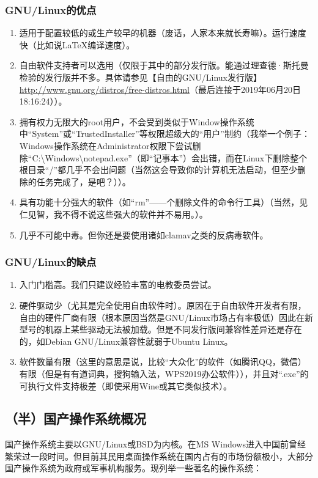 \subsubsection{GNU/Linux的优点}
\begin{enumerate}
	\item  适用于配置较低的或生产较早的机器（废话，人家本来就长寿嘛）。运行速度快（比如说\LaTeX 编译速度）。\par
	\item 自由软件支持者可以选用（仅限于其中的部分发行版。能通过理查德·斯托曼检验的发行版并不多。具体请参见【自由的GNU/Linux发行版】\url{http://www.gnu.org/distros/free-distros.html}（最后连接于2019年06月20日18:16:24））。\par
	\item 拥有权力无限大的root用户，不会受到类似于Window操作系统中“System”或“TrustedInstaller”等权限超级大的“用户”制约（我举一个例子：Windows操作系统在Administrator权限下尝试删除“C:\textbackslash Windows\textbackslash notepad.exe”（即“记事本”）会出错，而在Linux下删除整个根目录“/”都几乎不会出问题（当然这会导致你的计算机无法启动，但至少删除的任务完成了，是吧？））。\par
	\item 具有功能十分强大的软件（如“rm”——个删除文件的命令行工具）（当然，见仁见智，我不得不说这些强大的软件并不易用。）。
	\item 几乎不可能中毒。但你还是要使用诸如clamav之类的反病毒软件。
\end{enumerate}
\subsubsection{GNU/Linux的缺点}
\begin{enumerate}
	\item 入门门槛高。我们只建议经验丰富的电教委员尝试。
	\item 硬件驱动少（尤其是完全使用自由软件时）。原因在于自由软件开发者有限，自由的硬件厂商有限（根本原因当然是GNU/Linux市场占有率极低）因此在新型号的机器上某些驱动无法被加载。但是不同发行版间兼容性差异还是存在的，如Debian GNU/Linux兼容性就弱于Ubuntu Linux。
	\item 软件数量有限（这里的意思是说，比较“大众化”的软件（如腾讯QQ，微信）有限（但是有有道词典，搜狗输入法，WPS2019办公软件）），并且对“.exe”的可执行文件支持极差（即使采用Wine或其它类似技术）。	
\end{enumerate}
\subsection{（半）国产操作系统概况}
国产操作系统主要以GNU/Linux或BSD为内核。在MS Windows进入中国前曾经繁荣过一段时间。但目前其民用桌面操作系统在国内占有的市场份额极小，大部分国产操作系统为政府或军事机构服务。现列举一些著名的操作系统：
